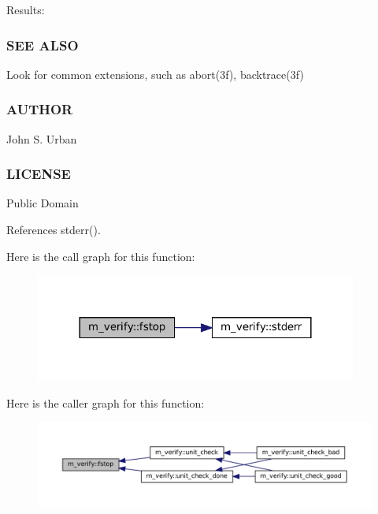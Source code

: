 Results\+:

\subsubsection*{S\+EE A\+L\+SO}

Look for common extensions, such as abort(3f), backtrace(3f)

\subsubsection*{A\+U\+T\+H\+OR}

John S. Urban \subsubsection*{L\+I\+C\+E\+N\+SE}

Public Domain 

References stderr().

Here is the call graph for this function\+:\nopagebreak
\begin{figure}[H]
\begin{center}
\leavevmode
\includegraphics[width=300pt]{namespacem__verify_a2695833d468118d68918d6aeabab6d0b_cgraph}
\end{center}
\end{figure}
Here is the caller graph for this function\+:\nopagebreak
\begin{figure}[H]
\begin{center}
\leavevmode
\includegraphics[width=350pt]{namespacem__verify_a2695833d468118d68918d6aeabab6d0b_icgraph}
\end{center}
\end{figure}
\mbox{\label{namespacem__verify_aa0d8de1c26ca3aae0366b9fb8ead21c4}} 
